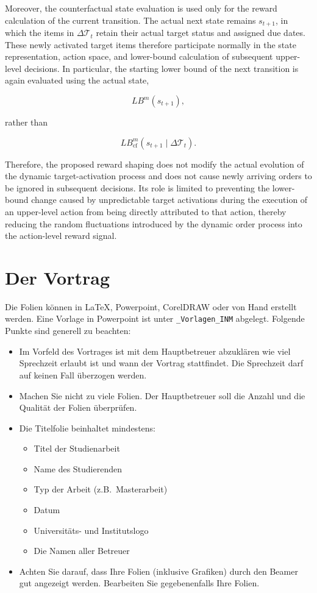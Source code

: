 Moreover, the counterfactual state evaluation is used only for the reward calculation of the current transition. The actual next state remains $s_{t+1}$, in which the items in $\Delta\mathcal{T}_t$ retain their actual target status and assigned due dates. These newly activated target items therefore participate normally in the state representation, action space, and lower-bound calculation of subsequent upper-level decisions. In particular, the starting lower bound of the next transition is again evaluated using the actual state,

\[
LB^m(s_{t+1}),
\]

rather than

\[
LB_{\mathrm{cf}}^m
\left(
s_{t+1}\mid\Delta\mathcal{T}_t
\right).
\]

Therefore, the proposed reward shaping does not modify the actual evolution of the dynamic target-activation process and does not cause newly arriving orders to be ignored in subsequent decisions. Its role is limited to preventing the lower-bound change caused by unpredictable target activations during the execution of an upper-level action from being directly attributed to that action, thereby reducing the random fluctuations introduced by the dynamic order process into the action-level reward signal.
\section{Der Vortrag}\label{sec:Vortrag}
Die Folien können in \LaTeX, Powerpoint, CorelDRAW oder von
Hand erstellt werden. Eine Vorlage in Powerpoint ist unter \verb"_Vorlagen_INM" abgelegt. Folgende Punkte sind generell zu beachten:
\begin{itemize}
 \item Im Vorfeld des Vortrages ist mit dem Hauptbetreuer abzuklären wie viel Sprechzeit erlaubt ist und wann der Vortrag stattfindet. Die Sprechzeit darf auf keinen Fall überzogen werden.

 \item Machen Sie nicht zu viele Folien. Der Hauptbetreuer soll die Anzahl und die Qualität der Folien überprüfen.

 \item Die Titelfolie beinhaltet mindestens:
  \begin{itemize}
   \item Titel der Studienarbeit
   \item Name des Studierenden
   \item Typ der Arbeit (z.B.~Masterarbeit)
   \item Datum
   \item Universitäts- und Institutslogo
   \item Die Namen aller Betreuer
  \end{itemize}

  \item Achten Sie darauf, dass Ihre Folien (inklusive Grafiken) durch den Beamer gut angezeigt werden. Bearbeiten Sie gegebenenfalls Ihre Folien.
\end{itemize}
